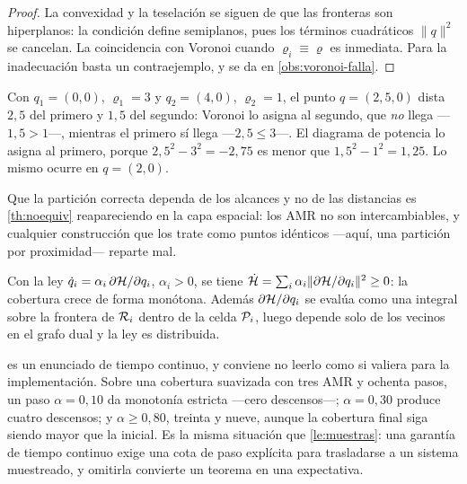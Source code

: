 \begin{proof}
La convexidad y la teselación se siguen de que las fronteras son hiperplanos:
la condición define semiplanos, pues los términos cuadráticos $\lVert q\rVert^2$
se cancelan. La coincidencia con Voronoi cuando $\varrho_i\equiv\varrho$ es
inmediata. Para la inadecuación basta un contraejemplo, y se da en
\cref{obs:voronoi-falla}.
\end{proof}

\begin{observacion}[El contraejemplo]
\label{obs:voronoi-falla}
Con $q_1=(0,0)$, $\varrho_1=3$ y $q_2=(4,0)$, $\varrho_2=1$, el punto $q=(2{,}5,0)$
dista $2{,}5$ del primero y $1{,}5$ del segundo: Voronoi lo asigna al segundo,
que \emph{no} llega —$1{,}5>1$—, mientras el primero sí llega —$2{,}5\le3$—. El
diagrama de potencia lo asigna al primero, porque $2{,}5^2-3^2=-2{,}75$ es menor
que $1{,}5^2-1^2=1{,}25$. Lo mismo ocurre en $q=(2,0)$.

Que la partición correcta dependa de los alcances y no de las distancias es
\cref{th:noequiv} reapareciendo en la capa espacial: los AMR no son
intercambiables, y cualquier construcción que los trate como puntos idénticos
—aquí, una partición por proximidad— reparte mal.
\end{observacion}

\begin{proposicion}
\label{pr:ascenso}
Con la ley $\dot q_i=\alpha_i\,\partial\mathcal{H}/\partial q_i$, $\alpha_i>0$, se
tiene $\dot{\mathcal{H}}=\sum_i\alpha_i\lVert\partial\mathcal{H}/\partial q_i\rVert^2\ge0$:
la cobertura crece de forma monótona. Además $\partial\mathcal{H}/\partial q_i$ se
evalúa como una integral sobre la frontera de $\mathcal{R}_i$ dentro de la celda
$\mathcal{P}_i$, luego depende solo de los vecinos en el grafo dual y la ley es
distribuida.
\end{proposicion}

\begin{observacion}
\label{obs:ascenso-muestreo}
 es un enunciado de tiempo continuo, y conviene no leerlo como
si valiera para la implementación. Sobre una cobertura suavizada con tres AMR y
ochenta pasos, un paso $\alpha=0{,}10$ da monotonía estricta —cero descensos—;
$\alpha=0{,}30$ produce cuatro descensos; y $\alpha\ge0{,}80$, treinta y nueve,
aunque la cobertura final siga siendo mayor que la inicial. Es la misma
situación que \cref{le:muestras}: una garantía de tiempo continuo exige una cota
de paso explícita para trasladarse a un sistema muestreado, y omitirla convierte
un teorema en una expectativa.
\end{observacion}

